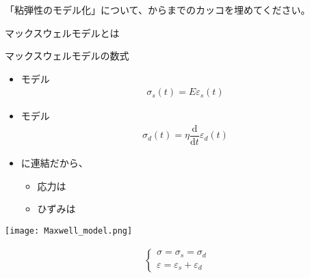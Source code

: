 \documentclass[uplatex,dvipdfmx,a4paper,11pt]{jsarticle}
\begin{document}
\begin{qlist}
	\qitem 「粘弾性のモデル化」について、からまでのカッコを埋めてください。
		\vspace{5mm}
		\begin{qlist2}
			\qitem マックスウェルモデルとは
			\begin{center}
				\begin{minipage}{0.4\textwidth}
					\begin{itembox}[l]{マックスウェルモデルの数式}
						\begin{itemize}
							\item \qbox{}モデル
							\begin{align*}
								\sigma_s(t) = E \varepsilon_s(t)
							\end{align*}
							\item \qbox{}モデル
							\begin{align*}
								\sigma_d(t) = \eta \dfrac{\mathrm{d}}{\mathrm{d}t}\varepsilon_d(t)
							\end{align*}
							\item \qbox{}に連結だから、
							\begin{itemize}
								\item 応力は\qbox{}
							\item ひずみは\qbox{}
							\end{itemize}
						\end{itemize}	
					\end{itembox}
				\end{minipage}
				\begin{minipage}{0.45\textwidth}
					\begin{center}
					\texttt{[image: Maxwell\_model.png]}
					\end{center}
					\begin{align*}
						\begin{cases}
							\sigma = \sigma_s = \sigma_d \\
							\varepsilon = \varepsilon_s + \varepsilon_d
						\end{cases}
					\end{align*}
				\end{minipage}
			\end{center}


\end{qlist2}
\end{qlist}
\end{document}
